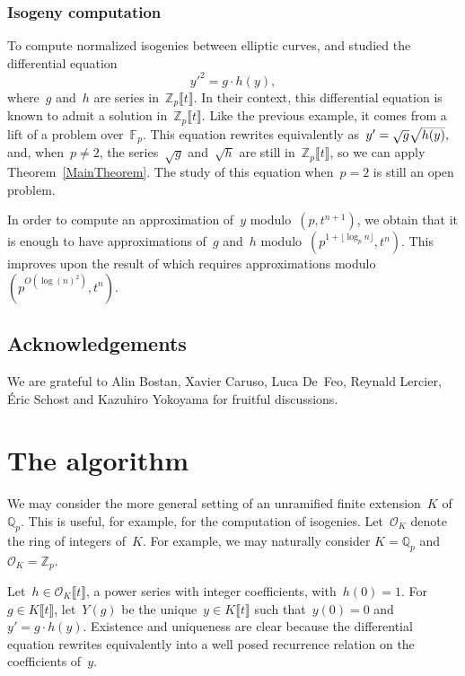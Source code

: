 \documentclass{sig-alternate}
\theoremstyle{definition}
\theoremstyle{remark}
\newcommand{\Z}{\mathbb{Z}}
\newcommand{\Q}{\mathbb{Q}}
\newcommand{\Qp}{\Q_p}
\newcommand{\Fp}{\mathbb{F}_p}
\newcommand\cO{\mathcal{O}}
\newcommand\Zpt{\mathbb{Z}_p \llbracket t \rrbracket}
\newcommand\Opt{\cO_K \llbracket t \rrbracket}
\newcommand\Kpt{K\llbracket t \rrbracket}
\begin{document}
\subsubsection{Isogeny computation}
\label{sec:intro-isogeny}

To compute normalized isogenies between elliptic curves, \textcite{Bostan:2008} and \textcite{LerSir08}
 studied the differential equation
\begin{equation}
\label{DiffEquQuad}y'^2 =g \cdot h(y),
\end{equation} where~$g$ and~$h$
are series in~$\Zpt$. In their context, this differential equation is known to admit a solution
in~$\Zpt$. Like the previous example, it comes from a lift of a problem over~$\Fp$.
This equation rewrites equivalently as~$y' = \smash{\sqrt{g}
\sqrt{h(y)}},$ and, when~$p\neq 2$, the series~$\sqrt{g}$ and~$\sqrt{h}$ are
still in~$\Zpt$, so we can apply Theorem~\ref{MainTheorem}.
The study of this equation when~$p=2$ is still an open problem.

In order to compute
an approximation of~$y$ modulo~$(p, t^{n+1})$,
we obtain that
it is enough to have approximations of~$g$ and~$h$ modulo~$(p^{1+ \lfloor\log_p n\rfloor}, t^n)$.
This improves upon the result of \textcite{LerSir08} which requires approximations modulo~$( p^{O(\log(n)^2)}, t^n)$.

\subsection*{Acknowledgements}
We are grateful to Alin Bostan, Xavier Caruso, 
Luca De~Feo, Reynald Lercier, Éric Schost and Kazuhiro Yokoyama 
for fruitful discussions.


\section{The algorithm}
\label{sec:algo}




We may consider the more general setting of an unramified finite
extension~$K$ of~$\Qp$. This
is useful, for example, for the computation of isogenies.
Let~$\cO_K$ denote the ring of integers of~$K$.
For example, we may naturally consider $K = \Qp$ and~$\cO_K = \Z_p$.

Let~$h \in \Opt$, a power series with integer coefficients, with~$h(0)=1$. 
For~$g\in\Kpt$, let~$Y(g)$ be the unique~$y\in \Kpt$ such that~$y(0)=0$
and~$y'=g\cdot h(y)$.  Existence and uniqueness are clear because the
differential equation rewrites equivalently into a well posed recurrence relation on the
coefficients of~$y$.
\end{document}
